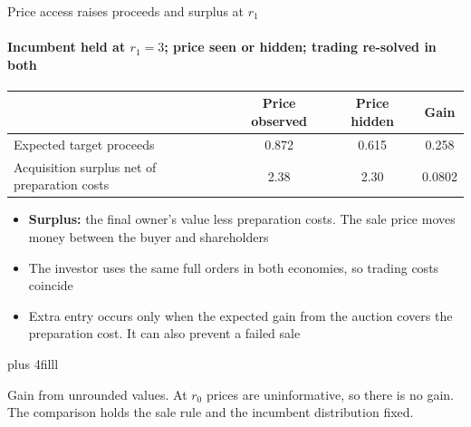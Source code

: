 \documentclass[10pt,aspectratio=169]{beamer}
\newcommand{\GrayLine}[1]{\par{\color{cGrayText}\footnotesize #1\par}}
\newcommand{\NavGap}{\par\vspace{0.45cm}}%
\begin{document}
\begin{frame}[t,label=F14]{Price access raises proceeds and surplus at $r_1$}
\framesubtitle{Incumbent held at $r_1=3$; %
price seen or hidden; trading re-solved in both}
\hypertarget{main:reserve}{}
\vspace{6pt}
\begin{center}
\renewcommand{\arraystretch}{1.25}
\begin{tabular*}{0.92\textwidth}{@{\extracolsep{\fill}}lccc@{}}
\toprule
 & Price observed & Price hidden & Gain\\
\midrule
Expected target proceeds & 0.872 %
 & 0.615 %
 & 0.258\\ %
Acquisition surplus net of preparation costs & 2.38 %
 & 2.30 %
 & 0.0802\\ %
\bottomrule
\end{tabular*}
\end{center}
\begin{itemize}\setlength{\itemsep}{4pt}
\item \textbf{Surplus:} the final owner's value less preparation costs. The sale price moves money between the buyer and shareholders
\item The investor uses the same full orders in both economies, so trading costs coincide
\item Extra entry occurs only when the expected gain from the auction covers the preparation cost. It can also prevent a failed sale
\end{itemize}
\vskip 0pt plus 4filll%
\GrayLine{Gain from unrounded values. At $r_0$ prices are uninformative, so there is no gain. The comparison holds the sale rule and the incumbent distribution fixed.}
\NavGap
{}
\end{frame}
\end{document}
